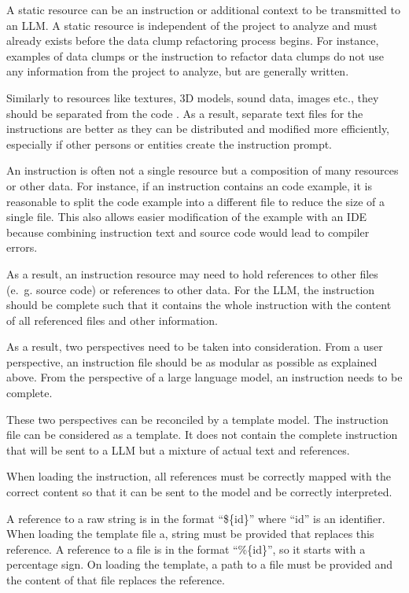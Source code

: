 A static resource can be an instruction or additional context to be transmitted to an \ac{LLM}. A static resource is independent of the project to analyze and must already exists before the data clump refactoring process begins. For instance, examples of data clumps or the instruction to refactor data clumps do not use any information from the project to analyze, but are generally written. 

 Similarly to resources like textures, 3D models, sound data, images etc., they should be separated from the code \cite{separate_code_data}. As a result, separate text files for the instructions are better as they can be distributed and modified more efficiently, especially if other persons or entities create the instruction prompt.

An instruction is often not a single resource but a composition of many resources or other data. For instance, if an instruction contains an code example, it is reasonable to split the code example into a different file to reduce the size of a single file. This  also allows easier modification of the example with an \ac{IDE} because combining instruction text and source code would lead to compiler errors.

As a result, an instruction resource may need to hold references to other files (e.~g. source code) or references to other data.
For the \ac{LLM}, the instruction should be complete such that it contains the whole instruction with the content of all referenced files and other information.

As a result, two perspectives need to be taken into consideration. From a user perspective, an instruction file should be as modular as possible as explained above. From the perspective of a large language model, an instruction needs to be complete. 

These two perspectives can be reconciled by a template model. The instruction file can be considered as a template. It does not contain the complete instruction that will be sent to a \ac{LLM} but a mixture of actual text and references.

When loading the instruction, all references must be correctly mapped with the correct content so that it can be sent to the model and be correctly interpreted. 

A reference to a raw string is in the format \enquote{\$\{id\}} where \enquote{id} is an identifier. When loading the template file a, string must be provided that replaces this reference.  A reference to a file is in the format \enquote{\%\{id\}}, so it starts with a percentage sign. On loading the template, a path to a file must be  provided and the content of that file replaces the reference. 

